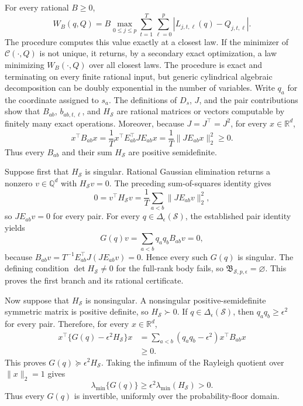 For every rational \(B\geq0\),
\[
 W_B(q,Q)
 =B\max_{0\leq j\leq p}
       \sum_{t=1}^T\sum_{\ell=0}^p
       |L_{j,t,\ell}(q)-Q_{j,t,\ell}|.
\]
The procedure computes this value exactly at a closest law.  If the minimizer of \(\mathcal C(\cdot,Q)\) is not unique, it returns, by a secondary exact optimization, a law minimizing \(W_B(\cdot,Q)\) over all closest laws.  The procedure is exact and terminating on every finite rational input, but generic cylindrical algebraic decomposition can be doubly exponential in the number of variables.
Write \(q_a\) for the coordinate assigned to \(s_a\).  The definitions of \(D_s\), \(J\), and the pair contributions show that \(B_{ab}\), \(b_{ab,t,\ell}\), and \(H_{\mathcal S}\) are rational matrices or vectors computable by finitely many exact operations.  Moreover, because \(J=J^{\top}=J^2\), for every \(x\in\mathbb R^d\),
\[
 x^{\top}B_{ab}x
 =\frac1T x^{\top}E_{ab}^{\top}JE_{ab}x
 =\frac1T\lVert JE_{ab}x\rVert_2^2\geq0.
\]
Thus every \(B_{ab}\) and their sum \(H_{\mathcal S}\) are positive semidefinite.

Suppose first that \(H_{\mathcal S}\) is singular.  Rational Gaussian elimination returns a nonzero \(v\in\mathbb Q^d\) with \(H_{\mathcal S}v=0\).  The preceding sum-of-squares identity gives
\[
 0=v^{\top}H_{\mathcal S}v
 =\frac1T\sum_{a<b}\lVert JE_{ab}v\rVert_2^2,
\]
so \(JE_{ab}v=0\) for every pair.  For every \(q\in\Delta_{\epsilon}(\mathcal S)\), the established pair identity yields
\[
 G(q)v=\sum_{a<b}q_aq_bB_{ab}v=0,
\]
because \(B_{ab}v=T^{-1}E_{ab}^{\top}J(JE_{ab}v)=0\).  Hence every such \(G(q)\) is singular.  The defining condition \(\det H_{\mathcal S}\neq0\) for the full-rank body fails, so \(\mathfrak B_{\mathcal S,p,\epsilon}=\varnothing\).  This proves the first branch and its rational certificate.

Now suppose that \(H_{\mathcal S}\) is nonsingular.  A nonsingular positive-semidefinite symmetric matrix is positive definite, so \(H_{\mathcal S}\succ0\).  If \(q\in\Delta_{\epsilon}(\mathcal S)\), then \(q_aq_b\geq\epsilon^2\) for every pair.  Therefore, for every \(x\in\mathbb R^d\),
\[
\begin{aligned}
 x^{\top}\{G(q)-\epsilon^2H_{\mathcal S}\}x
 &=\sum_{a<b}(q_aq_b-\epsilon^2)x^{\top}B_{ab}x\\
 &\geq0.
\end{aligned}
\]
This proves \(G(q)\succeq\epsilon^2H_{\mathcal S}\).  Taking the infimum of the Rayleigh quotient over \(\lVert x\rVert_2=1\) gives
\[
 \lambda_{\min}\{G(q)\}
 \geq\epsilon^2\lambda_{\min}(H_{\mathcal S})>0.
\]
Thus every \(G(q)\) is invertible, uniformly over the probability-floor domain.

